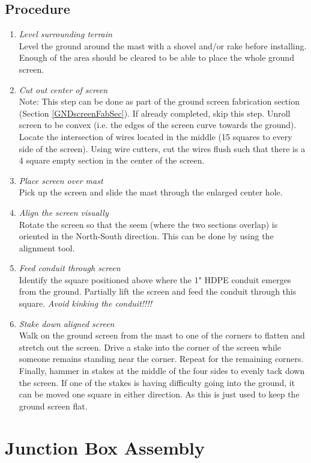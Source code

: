 \documentclass[12pt]{article}
\begin{document}
\begin{enumerate}
	\subsection{Procedure}
		\begin{enumerate}
			\item \emph{Level surrounding terrain} \\ Level the ground around the mast with a shovel and/or rake before installing. Enough of the area should be cleared to be able to place the whole ground screen.
			\item \emph{Cut out center of screen} \\ Note: This step can be done as part of the ground screen fabrication section (Section \ref{GNDscreenFabSec}). If already completed, skip this step. Unroll screen to be convex (i.e. the edges of the screen curve towards the ground). Locate the intersection of wires located in the middle (15 squares to every side of the screen). Using wire cutters, cut the wires flush such that there is a 4 square empty section in the center of the screen.
			\item \emph{Place screen over mast} \\ Pick up the screen and slide the mast through the enlarged center hole.
			\item \emph{Align the screen visually} \\ Rotate the screen so that the seem (where the two sections overlap) is oriented in the North-South direction. This can be done by using the alignment tool.
			\item \emph{Feed conduit through screen} \\ Identify the square positioned above where the 1" HDPE conduit emerges from the ground. Partially lift the screen and feed the conduit through this square. \emph{Avoid kinking the conduit!!!!}
			\item \emph{Stake down aligned screen} \\ Walk on the ground screen from the mast to one of the corners to flatten and stretch out the screen. Drive a stake into the corner of the screen while someone remains standing near the corner. Repeat for the remaining corners. Finally, hammer in stakes at the middle of the four sides to evenly tack down the screen. If one of the stakes is having difficulty going into the ground, it can be moved one square in either direction. As this is just used to keep the ground screen flat.
		\end{enumerate}


\section{Junction Box Assembly} \label{JuncBoxSec}

\end{enumerate}
\end{document}
